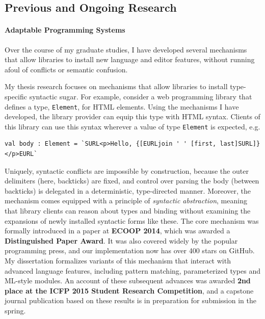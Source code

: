 \documentclass[9pt]{extarticle}
\let\li\lstinline
\begin{document}

\vspace{-8px}
\subsection*{Previous and Ongoing Research}
\vspace{-2px}
\paragraph{Adaptable Programming Systems}

Over the course of my graduate studies, I have developed several mechanisms that allow libraries to install new language and editor features, without running afoul of conflicts or semantic confusion.

My thesis research focuses on mechanisms that allow libraries to install type-specific syntactic sugar. For example, consider a web programming library that defines a type, \li{Element}, for HTML elements. Using the mechanisms I have developed, the library provider can equip this type with HTML syntax. Clients of this library can use this syntax wherever a value of type \li{Element} is expected, e.g.
\begin{lstlisting}[numbers=none]
val body : Element = `SURL<p>Hello, {[EURLjoin ' ' [first, last]SURL]}</p>EURL`
\end{lstlisting}
Uniquely, syntactic conflicts are impossible by construction, because the outer delimiters (here, backticks) are fixed, and control over parsing the body (between backticks) is delegated in a deterministic, type-directed manner. Moreover, the mechanism comes equipped with a principle of \emph{syntactic abstraction}, meaning that library clients can reason about types and binding without examining the expansions of newly installed syntactic forms like these. The core mechanism was formally introduced in a paper at \textbf{ECOOP 2014}, which was awarded a \textbf{Distinguished Paper Award}. It was  also covered widely by the popular programming press, and our implementation now has over 400 stars on GitHub. 
My dissertation formalizes variants of this mechanism that interact with advanced language features, including pattern matching, parameterized types and ML-style modules. An account of these subsequent advances was awarded \textbf{2nd place at the ICFP 2015 Student Research Competition}, and a capstone journal publication based on these results is in preparation for submission in the spring.
\end{document}
